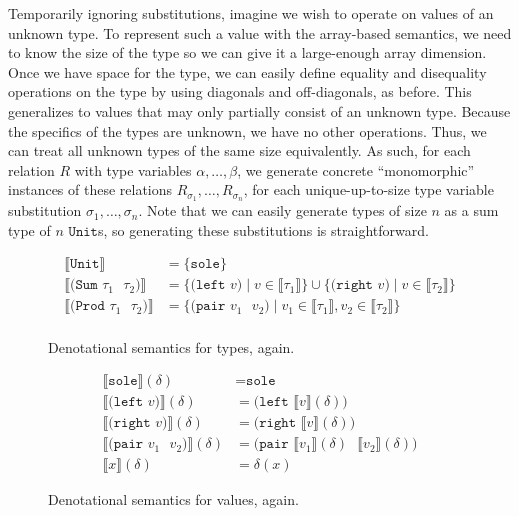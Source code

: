 \documentclass{report}
\theoremstyle{definition}
\newcommand{\den}[1]{\llbracket #1 \rrbracket}
\begin{document}
Temporarily ignoring substitutions, imagine we wish to operate on values of an unknown type.
To represent such a value with the array-based semantics, we need to know the size of the type so we can give it a large-enough array dimension.
Once we have space for the type, we can easily define equality and disequality operations on the type by using diagonals and off-diagonals, as before.
This generalizes to values that may only partially consist of an unknown type.
Because the specifics of the types are unknown, we have no other operations.
Thus, we can treat all unknown types of the same size equivalently.
As such, for each relation \(R\) with type variables \(\alpha, \dots, \beta\),
we generate concrete ``monomorphic'' instances of these relations \(R_{\sigma_1}, \dots, R_{\sigma_n}\), for each unique-up-to-size type variable substitution \(\sigma_1, \dots, \sigma_n\).
Note that we can easily generate types of size \(n\) as a sum type of \(n\) \(\texttt{Unit}\)s, so generating these substitutions is straightforward.

\begin{figure}
\begin{align*}
	\den{\texttt{Unit}} &= \{\texttt{sole}\} \\
	\den{\texttt{(Sum \(\tau_1\) \(\tau_2\))}} &= \{\texttt{(left \(v\))} \mid v \in \den{\tau_1}\} \cup \{\texttt{(right \(v\))} \mid v \in \den{\tau_2}\} \\
	\den{\texttt{(Prod \(\tau_1\) \(\tau_2\))}} &= \{\texttt{(pair \(v_1\) \(v_2\))} \mid v_1 \in \den{\tau_1}, v_2 \in \den{\tau_2}\} \\
\end{align*}
\caption{Denotational semantics for types, again.}
	\label{fig:poly-types-semantics}
\end{figure}

\begin{figure}
\begin{align*}
	\den{\texttt{sole}} (\delta) &= \texttt{sole} \\
	\den{\texttt{(left \(v\))}} (\delta) &= \texttt{(left \(\den{v} (\delta) \))} \\
	\den{\texttt{(right \(v\))}} (\delta) &= \texttt{(right \(\den{v} (\delta) \))} \\
	\den{\texttt{(pair \(v_1\) \(v_2\))}} (\delta) &= \texttt{(pair \(\den{v_1} (\delta) \) \(\den{v_2} (\delta)\))} \\
	\den{x} (\delta) &= \delta(x)
\end{align*}
\caption{Denotational semantics for values, again.}
	\label{fig:poly-values-semantics}
\end{figure}
\end{document}
